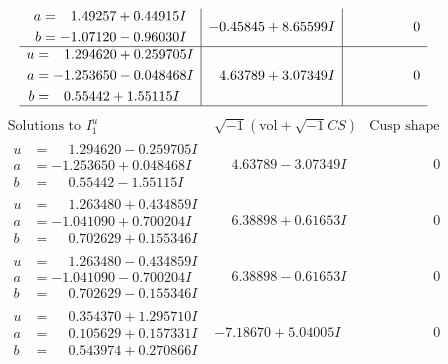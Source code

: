 \documentclass[1p]{elsarticle_modified}
\theoremstyle{definition}
\newcommand{\I}{\sqrt{-1}}
\begin{document}
$$\begin{array}{c|c|c}
\begin{aligned}
a &= \phantom{-}1.49257 + 0.44915 I \\
b &= -1.07120 - 0.96030 I\end{aligned}
 & -0.45845 + 8.65599 I & \phantom{-0.000000 } 0 \\ \hline\begin{aligned}
u &= \phantom{-}1.294620 + 0.259705 I \\
a &= -1.253650 - 0.048468 I \\
b &= \phantom{-}0.55442 + 1.55115 I\end{aligned}
 & \phantom{-}4.63789 + 3.07349 I & \phantom{-0.000000 } 0\\
 \hline 
 \end{array}$$\newpage$$\begin{array}{c|c|c}  
\text{Solutions to }I^u_{1}& \I (\text{vol} + \sqrt{-1}CS) & \text{Cusp shape}\\
 \hline 
\begin{aligned}
u &= \phantom{-}1.294620 - 0.259705 I \\
a &= -1.253650 + 0.048468 I \\
b &= \phantom{-}0.55442 - 1.55115 I\end{aligned}
 & \phantom{-}4.63789 - 3.07349 I & \phantom{-0.000000 } 0 \\ \hline\begin{aligned}
u &= \phantom{-}1.263480 + 0.434859 I \\
a &= -1.041090 + 0.700204 I \\
b &= \phantom{-}0.702629 + 0.155346 I\end{aligned}
 & \phantom{-}6.38898 + 0.61653 I & \phantom{-0.000000 } 0 \\ \hline\begin{aligned}
u &= \phantom{-}1.263480 - 0.434859 I \\
a &= -1.041090 - 0.700204 I \\
b &= \phantom{-}0.702629 - 0.155346 I\end{aligned}
 & \phantom{-}6.38898 - 0.61653 I & \phantom{-0.000000 } 0 \\ \hline\begin{aligned}
u &= \phantom{-}0.354370 + 1.295710 I \\
a &= \phantom{-}0.105629 + 0.157331 I \\
b &= \phantom{-}0.543974 + 0.270866 I\end{aligned}
 & -7.18670 + 5.04005 I & \phantom{-0.000000 } 0 \\ \hline\begin{aligned}

\end{aligned}
\end{array}$$
\end{document}

